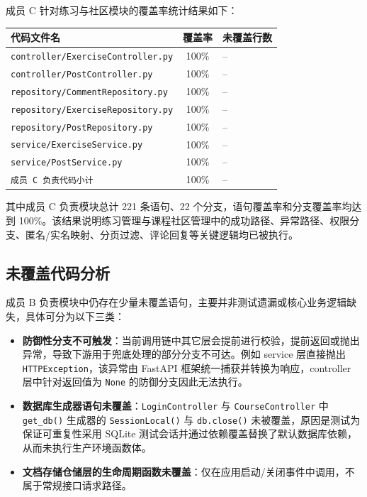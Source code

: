 \documentclass[12pt,a4paper]{ctexart}
\begin{document}
成员 C 针对练习与社区模块的覆盖率统计结果如下：

\begin{center}
\begin{tabular}{|p{7.4cm}|c|p{4.3cm}|}
\hline
\textbf{代码文件名} & \textbf{覆盖率} & \textbf{未覆盖行数} \\
\hline
\texttt{controller/ExerciseController.py} & 100\% & -- \\
\hline
\texttt{controller/PostController.py} & 100\% & -- \\
\hline
\texttt{repository/CommentRepository.py} & 100\% & -- \\
\hline
\texttt{repository/ExerciseRepository.py} & 100\% & -- \\
\hline
\texttt{repository/PostRepository.py} & 100\% & -- \\
\hline
\texttt{service/ExerciseService.py} & 100\% & -- \\
\hline
\texttt{service/PostService.py} & 100\% & -- \\
\hline
\texttt{成员 C 负责代码小计} & 100\% & -- \\
\hline
\end{tabular}
\end{center}

其中成员 C 负责模块总计 221 条语句、22 个分支，语句覆盖率和分支覆盖率均达到 100\%。该结果说明练习管理与课程社区管理中的成功路径、异常路径、权限分支、匿名/实名映射、分页过滤、评论回复等关键逻辑均已被执行。

\subsection{未覆盖代码分析}

成员 B 负责模块中仍存在少量未覆盖语句，主要并非测试遗漏或核心业务逻辑缺失，具体可分为以下三类：
\begin{itemize}
  \item \textbf{防御性分支不可触发}：当前调用链中其它层会提前进行校验，提前返回或抛出异常，导致下游用于兜底处理的部分分支不可达。例如 service 层直接抛出 \texttt{HTTPException}，该异常由 FastAPI 框架统一捕获并转换为响应，controller 层中针对返回值为 \texttt{None} 的防御分支因此无法执行。
  \item \textbf{数据库生成器语句未覆盖}：\texttt{LoginController} 与 \texttt{CourseController} 中 \texttt{get\_db()} 生成器的 \texttt{SessionLocal()} 与 \texttt{db.close()} 未被覆盖，原因是测试为保证可重复性采用 SQLite 测试会话并通过依赖覆盖替换了默认数据库依赖，从而未执行生产环境函数体。
  \item \textbf{文档存储仓储层的生命周期函数未覆盖}：仅在应用启动/关闭事件中调用，不属于常规接口请求路径。
\end{itemize}
\end{document}
